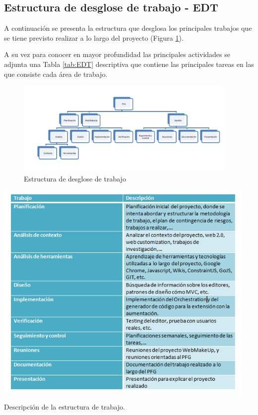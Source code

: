 \subsection{Estructura de desglose de trabajo - EDT}
\label{sec:EDT}

A continuación se presenta la estructura que desglosa los principales trabajos que se tiene previsto realizar a lo largo del proyecto (Figura \ref{fig:EDT}).

A su vez para conocer en mayor profundidad las principales actividades se adjunta una Tabla \ref{tab:EDT} descriptiva que contiene las principales tareas en las que consiste cada área de trabajo.

\begin{figure}
\begin{center}
\includegraphics[width=0.95\textwidth]{figs/6-EDT.png}
\caption{Estructura de desglose de trabajo}
\label{fig:EDT}
\end{center}
\end{figure}

\begin{table}
\includegraphics[width=0.95\textwidth]{figs/6-EDTTable.png}
\caption{Descripción de la estructura de trabajo.}
\label{tab:EDT}
\end{table}

